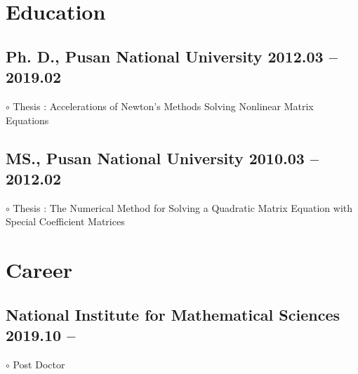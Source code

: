 \documentclass[11pt]{article} %
\begin{document}

\section*{Education}

\subsection*{Ph. D., Pusan National University \hfill 2012.03 -- 2019.02} %
$\circ$ Thesis : Accelerations of Newton's Methods Solving Nonlinear Matrix Equations

\subsection*{MS., Pusan National University \hfill 2010.03 -- 2012.02} %
$\circ$ Thesis : The Numerical Method for Solving a Quadratic Matrix Equation with Special Coefficient Matrices


%


\section*{Career}
\subsection*{National Institute for Mathematical Sciences \hfill 2019.10 -- \phantom{0000.00}}
$\circ$ Post Doctor
\end{document}
